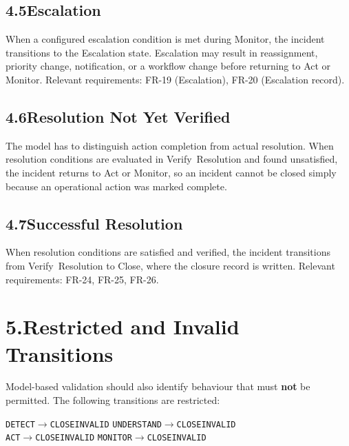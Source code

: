 \documentclass[11pt,a4paper]{article}
\begin{document}
\subsection*{4.5\enspace Escalation}

When a configured escalation condition is met during Monitor, the incident transitions to the Escalation state. Escalation may result in reassignment, priority change, notification, or a workflow change before returning to Act or Monitor. Relevant requirements: FR-19 (Escalation), FR-20 (Escalation record).

\subsection*{4.6\enspace Resolution Not Yet Verified}

The model has to distinguish action completion from actual resolution. When resolution conditions are evaluated in Verify~Resolution and found unsatisfied, the incident returns to Act or Monitor, so an incident cannot be closed simply because an operational action was marked complete.

\subsection*{4.7\enspace Successful Resolution}

When resolution conditions are satisfied and verified, the incident transitions from Verify~Resolution to Close, where the closure record is written. Relevant requirements: FR-24, FR-25, FR-26.

\section*{5.\enspace Restricted and Invalid Transitions}

Model-based validation should also identify behaviour that must \textbf{not} be permitted. The following transitions are restricted:

\begin{center}
\small
\texttt{DETECT\;$\rightarrow$\;CLOSE\quad INVALID}\qquad
\texttt{UNDERSTAND\;$\rightarrow$\;CLOSE\quad INVALID}\\[3pt]
\texttt{ACT\;$\rightarrow$\;CLOSE\quad INVALID}\qquad
\texttt{MONITOR\;$\rightarrow$\;CLOSE\quad INVALID}
\end{center}
\end{document}
